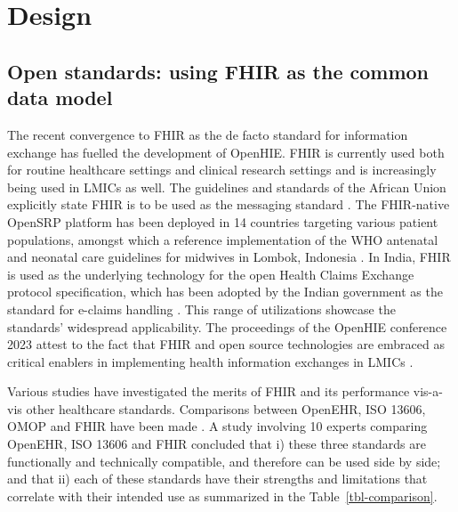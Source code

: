 \documentclass[
  authoryear]{elsarticle}
\begin{document}
\section{Design}\label{design}

\subsection{Open standards: using FHIR as the common data
model}\label{open-standards-using-fhir-as-the-common-data-model}

The recent convergence to FHIR as the de facto standard for information
exchange has fuelled the development of OpenHIE. FHIR is currently used
both for routine healthcare settings \citep{ayaz2021fast} and clinical
research settings \citep{duda2022hl7, vorisek2022fast} and is
increasingly being used in LMICs as well. The guidelines and standards
of the African Union explicitly state FHIR is to be used as the
messaging standard \citep{2023african}. The FHIR-native OpenSRP platform
\citep{mehl2020open} has been deployed in 14 countries targeting various
patient populations, amongst which a reference implementation of the WHO
antenatal and neonatal care guidelines for midwives in Lombok, Indonesia
\citep{summitinstitutefordevelopment2023bunda, kurniawan2019midwife}. In
India, FHIR is used as the underlying technology for the open Health
Claims Exchange protocol specification, which has been adopted by the
Indian government as the standard for e-claims handling \citep{hcx}.
This range of utilizations showcase the standards' widespread
applicability. The proceedings of the OpenHIE conference 2023 attest to
the fact that FHIR and open source technologies are embraced as critical
enablers in implementing health information exchanges in LMICs
\citep{ohie2023unconference}.

Various studies have investigated the merits of FHIR and its performance
vis-a-vis other healthcare standards. Comparisons between OpenEHR, ISO
13606, OMOP and FHIR have been made
\citep{ayaz2023transforming, mullie2023coda, rinaldi2021openehr, cremonesi2023need, sinaci2023data}.
A study involving 10 experts comparing OpenEHR, ISO 13606 and FHIR
concluded that i) these three standards are functionally and technically
compatible, and therefore can be used side by side; and that ii) each of
these standards have their strengths and limitations that correlate with
their intended use as summarized in the Table~\ref{tbl-comparison}.
\end{document}
